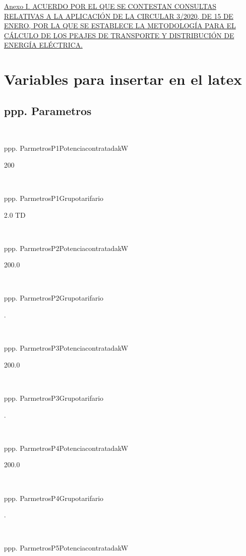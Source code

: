 \documentclass[a4paper,10pt]{article}
\begin{document}
\begin{Form}
\begin{thebibliography}{99}
\href{}
{}


\href{https://www.cnmc.es/sites/default/files/3416756_135.pdf}
{Anexo I. ACUERDO POR EL QUE SE CONTESTAN CONSULTAS RELATIVAS A LA
APLICACIÓN DE LA CIRCULAR 3/2020, DE 15 DE ENERO, POR LA QUE SE
ESTABLECE LA METODOLOGÍA PARA EL CÁLCULO DE LOS PEAJES DE
TRANSPORTE Y DISTRIBUCIÓN DE ENERGÍA ELÉCTRICA.}




\end{thebibliography}








\ifdefined\MostrarVariablesAlFinal
\newpage
\onecolumn


\newpage 
\section{Variables para insertar en el latex}
\newpage 
\subsection{ppp. Parametros}\

ppp. ParmetrosP1PotenciacontratadakW

200 \

\

ppp. ParmetrosP1Grupotarifario

2.0 TD \

\

ppp. ParmetrosP2PotenciacontratadakW

200.0 \

\

ppp. ParmetrosP2Grupotarifario

. \

\

ppp. ParmetrosP3PotenciacontratadakW

200.0 \

\

ppp. ParmetrosP3Grupotarifario

. \

\

ppp. ParmetrosP4PotenciacontratadakW

200.0 \

\

ppp. ParmetrosP4Grupotarifario

. \

\

ppp. ParmetrosP5PotenciacontratadakW


\end{Form}
\end{document}
